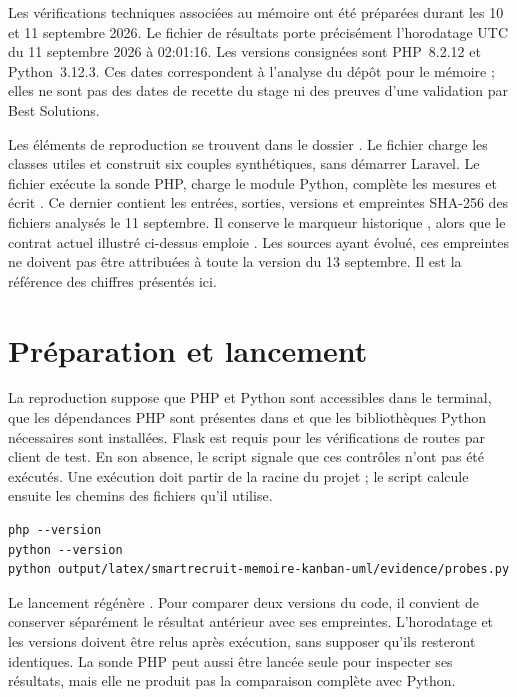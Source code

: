 Les vérifications techniques associées au mémoire ont été préparées durant les 10 et 11 septembre 2026. Le fichier de résultats porte précisément l'horodatage UTC du 11 septembre 2026 à 02:01:16. Les versions consignées sont PHP~8.2.12 et Python~3.12.3. Ces dates correspondent à l'analyse du dépôt pour le mémoire ; elles ne sont pas des dates de recette du stage ni des preuves d'une validation par Best Solutions.

Les éléments de reproduction se trouvent dans le dossier . Le fichier  charge les classes utiles et construit six couples synthétiques, sans démarrer Laravel. Le fichier  exécute la sonde PHP, charge le module Python, complète les mesures et écrit . Ce dernier contient les entrées, sorties, versions et empreintes SHA-256 des fichiers analysés le 11 septembre. Il conserve le marqueur historique , alors que le contrat actuel illustré ci-dessus emploie . Les sources ayant évolué, ces empreintes ne doivent pas être attribuées à toute la version du 13 septembre. Il est la référence des chiffres présentés ici.

\section{Préparation et lancement}

La reproduction suppose que PHP et Python sont accessibles dans le terminal, que les dépendances PHP sont présentes dans  et que les bibliothèques Python nécessaires sont installées. Flask est requis pour les vérifications de routes par client de test. En son absence, le script signale que ces contrôles n'ont pas été exécutés. Une exécution doit partir de la racine du projet ; le script calcule ensuite les chemins des fichiers qu'il utilise.

\begin{lstlisting}[caption={Commandes de reproduction depuis la racine}]
php --version
python --version
python output/latex/smartrecruit-memoire-kanban-uml/evidence/probes.py
\end{lstlisting}

Le lancement régénère . Pour comparer deux versions du code, il convient de conserver séparément le résultat antérieur avec ses empreintes. L'horodatage et les versions doivent être relus après exécution, sans supposer qu'ils resteront identiques. La sonde PHP peut aussi être lancée seule pour inspecter ses résultats, mais elle ne produit pas la comparaison complète avec Python.

